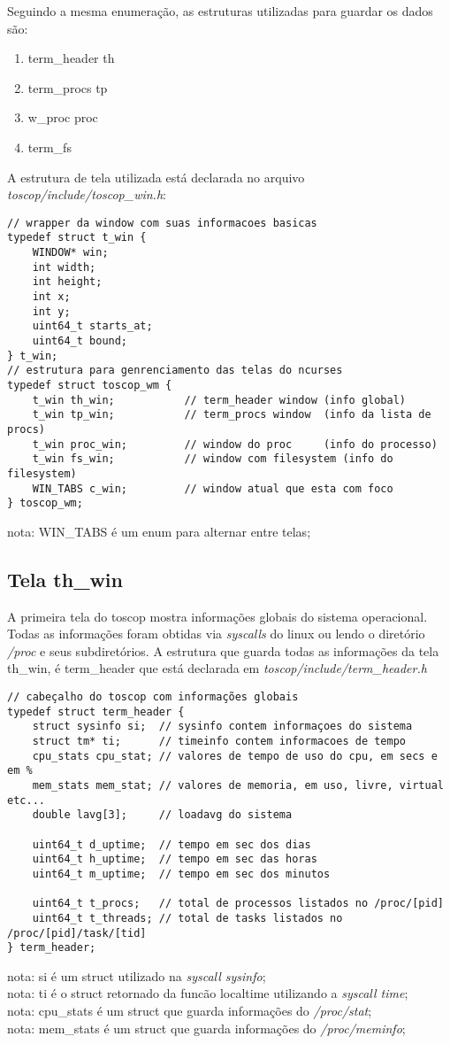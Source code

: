 \documentclass{article}
\begin{document}
Seguindo a mesma enumeração, as estruturas utilizadas para guardar os dados são:
\begin{enumerate}
    \item term\_header th 
    \item term\_procs tp
    \item w\_proc proc
    \item term\_fs
\end{enumerate}
A estrutura de tela utilizada está declarada no arquivo 
\textit{toscop/include/toscop\_win.h}:
\begin{verbatim}
// wrapper da window com suas informacoes basicas
typedef struct t_win {
    WINDOW* win;
    int width;
    int height;
    int x;
    int y;
    uint64_t starts_at;
    uint64_t bound;
} t_win;
// estrutura para genrenciamento das telas do ncurses
typedef struct toscop_wm {
    t_win th_win;           // term_header window (info global)
    t_win tp_win;           // term_procs window  (info da lista de procs)
    t_win proc_win;         // window do proc     (info do processo)
    t_win fs_win;           // window com filesystem (info do filesystem) 
    WIN_TABS c_win;         // window atual que esta com foco
} toscop_wm;
\end{verbatim}
nota: WIN\_TABS é um enum para alternar entre telas;

\subsection{Tela th\_win}
A primeira tela do toscop mostra informações globais do sistema 
operacional. Todas as informações foram obtidas via \textit{syscalls}
do linux ou lendo o diretório \textit{/proc} e seus subdiretórios. A 
estrutura que guarda todas as informações da tela th\_win, é term\_header
que está declarada em \textit{toscop/include/term\_header.h} 

\begin{verbatim}
// cabeçalho do toscop com informações globais
typedef struct term_header {
    struct sysinfo si;  // sysinfo contem informaçoes do sistema
    struct tm* ti;      // timeinfo contem informacoes de tempo
    cpu_stats cpu_stat; // valores de tempo de uso do cpu, em secs e em %
    mem_stats mem_stat; // valores de memoria, em uso, livre, virtual etc...
    double lavg[3];     // loadavg do sistema

    uint64_t d_uptime;  // tempo em sec dos dias
    uint64_t h_uptime;  // tempo em sec das horas
    uint64_t m_uptime;  // tempo em sec dos minutos

    uint64_t t_procs;   // total de processos listados no /proc/[pid]
    uint64_t t_threads; // total de tasks listados no /proc/[pid]/task/[tid]
} term_header;
\end{verbatim}
nota: si é um struct utilizado na \textit{syscall sysinfo};\\
nota: ti é o struct retornado da funcão localtime utilizando a \textit{syscall time};\\
nota: cpu\_stats é um struct que guarda informações do \textit{/proc/stat};\\
nota: mem\_stats é um struct que guarda informações do \textit{/proc/meminfo};
\end{document}
